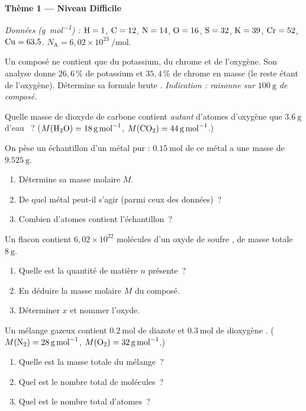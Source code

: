 \documentclass[11pt,a4paper]{article}
\begin{document}
\begin{center}{\large\bfseries\color{primarydark} Thème 1 — Niveau Difficile}\end{center}
\emph{Données (\si{\gram\per\mole}) :} $\ce{H}=1$, $\ce{C}=12$, $\ce{N}=14$, $\ce{O}=16$,
$\ce{S}=32$, $\ce{K}=39$, $\ce{Cr}=52$, $\ce{Cu}=63{,}5$. \quad $N_{\mathrm{A}} = 6{,}02\times10^{23}\ \si{\per\mole}$.

\begin{exo}
Un composé ne contient que du potassium, du chrome et de l'oxygène. Son analyse donne
$26{,}6\,\%$ de potassium et $35{,}4\,\%$ de chrome en masse (le reste étant de l'oxygène).
Détermine sa formule brute .
\emph{Indication : raisonne sur $\SI{100}{\gram}$ de composé.}
\end{exo}

\begin{exo}
Quelle masse de dioxyde de carbone  contient \emph{autant} d'atomes d'oxygène que
$\SI{3.6}{\gram}$ d'eau ~? ($M(\ce{H2O})=\SI{18}{\gram\per\mole}$, $M(\ce{CO2})=\SI{44}{\gram\per\mole}$.)
\end{exo}

\begin{exo}
On pèse un échantillon d'un métal pur : $\SI{0.15}{\mole}$ de ce métal a une masse de $\SI{9.525}{\gram}$.
\begin{enumerate}[label=\alph*)]
  \item Détermine sa masse molaire $M$.
  \item De quel métal peut-il s'agir (parmi ceux des données)~?
  \item Combien d'atomes contient l'échantillon~?
\end{enumerate}
\end{exo}

\begin{exo}
Un flacon contient $6{,}02\times10^{22}$ molécules d'un oxyde de soufre , de masse totale
$\SI{8}{\gram}$.
\begin{enumerate}[label=\alph*)]
  \item Quelle est la quantité de matière $n$ présente~?
  \item En déduire la masse molaire $M$ du composé.
  \item Déterminer $x$ et nommer l'oxyde.
\end{enumerate}
\end{exo}

\begin{exo}
Un mélange gazeux contient $\SI{0.2}{\mole}$ de diazote  et $\SI{0.3}{\mole}$ de
dioxygène . ($M(\ce{N2})=\SI{28}{\gram\per\mole}$, $M(\ce{O2})=\SI{32}{\gram\per\mole}$.)
\begin{enumerate}[label=\alph*)]
  \item Quelle est la masse totale du mélange~?
  \item Quel est le nombre total de molécules~?
  \item Quel est le nombre total d'atomes~?
\end{enumerate}
\end{exo}
\end{document}
